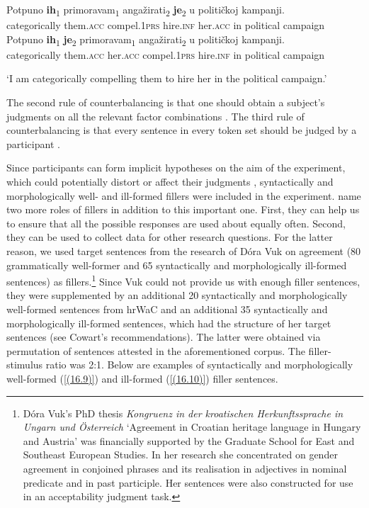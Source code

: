 \begin{exe}\ex
\begin{xlist}
\ex\label{(16.8a)}
\gll Potpuno \textbf{ih}\textsubscript{1} primoravam\textsubscript{1} angažirati\textsubscript{2} \textbf{je}\textsubscript{2} u političkoj kampanji.\\
 categorically them.\textsc{acc} compel.1\textsc{prs} hire.\textsc{inf} her.\textsc{acc} in political campaign \\
\ex\label{(16.8b)}
\gll Potpuno \textbf{ih}\textsubscript{1} \textbf{je}\textsubscript{2} primoravam\textsubscript{1} angažirati\textsubscript{2} u političkoj kampanji. \\
 categorically them.\textsc{acc} her.\textsc{acc} compel.1\textsc{prs} hire.\textsc{inf} in political campaign \\
\end{xlist}
\glt ‘I am categorically compelling them to hire her in the political campaign.’
\end{exe}

\noindent The second rule of counterbalancing is that one should obtain a subject’s judgments on all the relevant factor combinations \citep[cf.][50, 93]{Cowart97}. The third rule of counterbalancing is that every sentence in every token set should be judged by a participant \citep[][93]{Cowart97}. 

Since participants can form implicit hypotheses on the aim of the experiment, which could potentially distort or affect their judgments \citep[cf.][51f, 93f]{Cowart97}, syntactically and morphologically well- and ill-formed fillers were included in the experiment. \citet[][39]{SchutzeSprouse13} name two more roles of fillers in addition to this important one. First, they can help us to ensure that all the possible responses are used about equally often. Second, they can be used to collect data for other research questions. For the latter reason, we used target sentences from the research of Dóra Vuk on agreement (80 grammatically well-former and 65 syntactically and morphologically ill-formed sentences) as fillers.\footnote{Dóra Vuk’s PhD thesis \textit{Kongruenz in der kroatischen Herkunftssprache in Ungarn und Österreich} ‘Agreement in Croatian heritage language in Hungary and Austria’ was financially supported by the Graduate School for East and Southeast European Studies. In her research she concentrated on gender agreement in conjoined phrases and its realisation in adjectives in nominal predicate and in past participle. Her sentences were also constructed for use in an acceptability judgment task.} Since Vuk could not provide us with enough filler sentences, they were supplemented by an additional 20 syntactically and morphologically well-formed sentences from hrWaC and an additional 35 syntactically and morphologically ill-formed sentences, which had the structure of her target sentences (see Cowart's \citeyear[][52]{Cowart97} recommendations). The latter were obtained via permutation of sentences attested in the aforementioned corpus. The filler-stimulus ratio was 2:1. Below are examples of syntactically and morphologically well-formed (\ref{(16.9)}) and ill-formed (\ref{(16.10)}) filler sentences.

